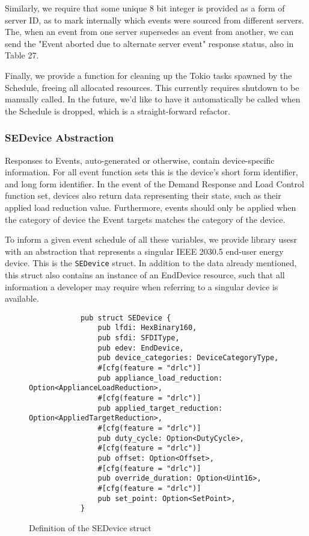 Similarly, we require that some unique 8 bit integer is provided as a form of server ID, as to mark internally which events were sourced from different servers. The, when an event from one server supersedes an event from another, we can send the "Event aborted due to alternate server event" response status, also in Table 27. \cite{IEEE2030.5}

Finally, we provide a function for cleaning up the Tokio tasks spawned by the Schedule, freeing all allocated resources. This currently requires shutdown to be manually called. In the future, we'd like to have it automatically be called when the Schedule is dropped, which is a straight-forward refactor.

\subsubsection{SEDevice Abstraction}

Responses to Events, auto-generated or otherwise, contain device-specific information. For all event function sets this is the device's short form identifier, and long form identifier. In the event of the Demand Response and Load Control function set, devices also return data representing their state, such as their applied load reduction value.
Furthermore, events should only be applied when the category of device the Event targets matches the category of the device.

To inform a given event schedule of all these variables, we provide library usesr with an abstraction that represents a singular IEEE 2030.5 end-user energy device. This is the \texttt{SEDevice} struct.
In addition to the data already mentioned, this struct also contains an instance of an EndDevice resource, such that all information a developer may require when referring to a singular device is available.

\begin{figure}[h]
    \begin{center}
        \begin{lstlisting}
            pub struct SEDevice {
                pub lfdi: HexBinary160,
                pub sfdi: SFDIType,
                pub edev: EndDevice,
                pub device_categories: DeviceCategoryType,
                #[cfg(feature = "drlc")]
                pub appliance_load_reduction: Option<ApplianceLoadReduction>,
                #[cfg(feature = "drlc")]
                pub applied_target_reduction: Option<AppliedTargetReduction>,
                #[cfg(feature = "drlc")]
                pub duty_cycle: Option<DutyCycle>,
                #[cfg(feature = "drlc")]
                pub offset: Option<Offset>,
                #[cfg(feature = "drlc")]
                pub override_duration: Option<Uint16>,
                #[cfg(feature = "drlc")]
                pub set_point: Option<SetPoint>,
            }
        \end{lstlisting}
        \label{fig:sedevicestruct}
        \vspace{-10pt}
        \caption{Definition of the SEDevice struct}
    \end{center}
\end{figure}


